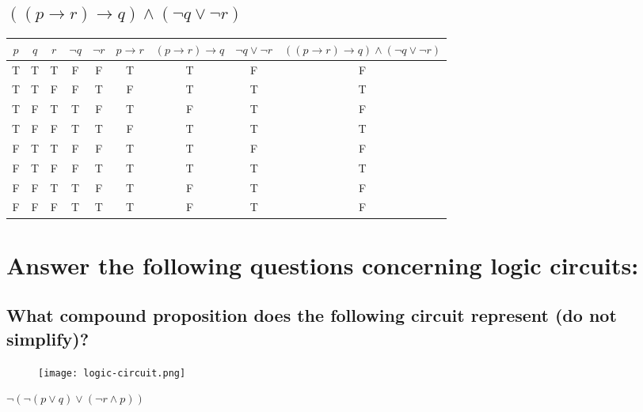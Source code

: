 \documentclass{article}
\begin{document}
    \subsection{\texorpdfstring{$((p \to r) \to q) \wedge (\neg q \vee \neg r)$}{((p → r) → q) ∧ (¬q ∨ ¬r)}} 
        \begin{center}
            \begin{tabular}{|c|c|c|c|c|c|c|c|c|}
                \hline
                $p$ & $q$ & $r$ & $\neg q$ & $\neg r$ & $p \to r$ & $(p \to r) \to q$ & $\neg q \vee \neg r$ & $((p \to r) \to q) \wedge (\neg q \vee \neg r)$ \\
                \hline
                T & T & T & F & F & T & T & F & F \\
                T & T & F & F & T & F & T & T & T \\
                T & F & T & T & F & T & F & T & F \\  
                T & F & F & T & T & F & T & T & T \\
                F & T & T & F & F & T & T & F & F \\
                F & T & F & F & T & T & T & T & T \\
                F & F & T & T & F & T & F & T & F \\
                F & F & F & T & T & T & F & T & F \\
                \hline
            \end{tabular}
        \end{center}

\section{Answer the following questions concerning logic circuits:}
    \subsection{What compound proposition does the following circuit represent (do not simplify)?} 
        \begin{figure}[h]
            \centering
            \texttt{[image: logic-circuit.png]}
        \end{figure}
    \texorpdfstring{$\neg(\neg(p\vee q) \vee (\neg r \wedge p))$}{¬(p ∨ q) ∨ (¬r ∧ p) }
\end{document}
